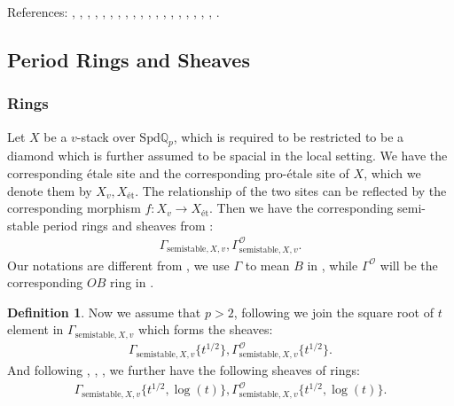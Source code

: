 \documentclass[12pt]{book}
\theoremstyle{definition}
\newtheorem{definition}{Definition}
\begin{document}
\noindent References: \cite{Sch1}, \cite{Sch2}, \cite{FS}, \cite{KL1}, \cite{KL2}, \cite{BL1}, \cite{BL2}, \cite{BS}, \cite{BHS}, \cite{Fon1}, \cite{CS1}, \cite{CS2}, \cite{BK}, \cite{BBK}, \cite{BBBK}, \cite{KKM}, \cite{KM}, \cite{LZ}, \cite{Shi}, \cite{M}.


\subsection{Period Rings and Sheaves}


\subsubsection{Rings}

\noindent Let $X$ be a $v$-stack over $\mathrm{Spd}\mathbb{Q}_p$, which is required to be restricted to be a diamond which is further assumed to be spacial in the local setting. We have the corresponding \'etale site and the corresponding pro-\'etale site of $X$, which we denote them by $X_{v},X_\text{\'et}$. The relationship of the two sites can be reflected by the corresponding morphism $f:X_{v}\longrightarrow X_\text{\'et}$. Then we have the corresponding semi-stable period rings and sheaves from \cite{Shi}:
\begin{align}
\Gamma_{\text{semistable},X,v}, \Gamma^\mathcal{O}_{\text{semistable},X,v}.
\end{align}
Our notations are different from \cite{Shi}, we use $\Gamma$ to mean $B$ in \cite{Shi}, while $\Gamma^\mathcal{O}$ will be the corresponding $OB$ ring in \cite{Shi}.\\

\begin{definition}
\indent Now we assume that $p>2$, following \cite{BS} we join the square root of $t$ element in $\Gamma_{\text{semistable},X,v}$ which forms the sheaves:
\begin{align}
\Gamma_{\text{semistable},X,v}\{t^{1/2}\},\Gamma^\mathcal{O}_{\text{semistable},X,v}\{t^{1/2}\}.
\end{align}
And following \cite{BL1}, \cite{BL2}, \cite{Fon1}, \cite{BHS} we further have the following sheaves of rings:
\begin{align}
\Gamma_{\text{semistable},X,v}\{t^{1/2},\log(t)\},\Gamma^\mathcal{O}_{\text{semistable},X,v}\{t^{1/2},\log(t)\}.
\end{align}
\end{definition}
\end{document}
